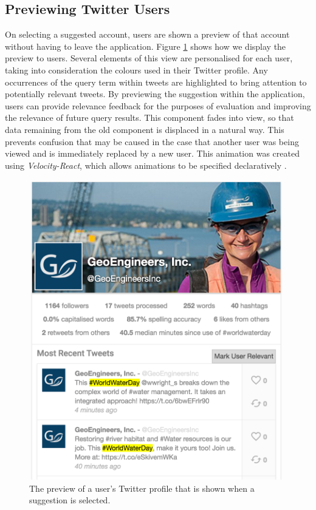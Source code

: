 \documentclass{l4proj}
\begin{document}
        \subsection{Previewing Twitter Users}
        On selecting a suggested account, users are shown a preview of that account without having to leave the application. Figure \ref{userpreview} shows how we display the preview to users. Several elements of this view are personalised for each user, taking into consideration the colours used in their Twitter profile. Any occurrences of the query term within tweets are highlighted to bring attention to potentially relevant tweets. By previewing the suggestion within the application, users can provide relevance feedback for the purposes of evaluation and improving the relevance of future query results. This component fades into view, so that data remaining from the old component is displaced in a natural way. This prevents confusion that may be caused in the case that another user was being viewed and is immediately replaced by a new user. This animation was created using \textit{Velocity-React}, which allows animations to be specified declaratively \cite{velocityreact}.
        
\begin{figure}
\centering
\includegraphics[scale=0.5]{userpreview.png}
\caption{The preview of a user's Twitter profile that is shown when a suggestion is selected.}
\label{userpreview}
\end{figure}         
        
\end{document}
